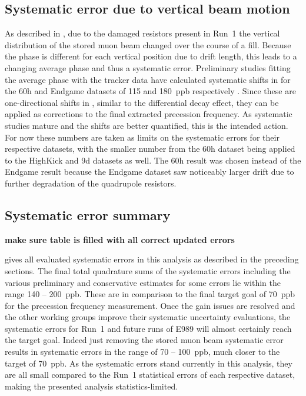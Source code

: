 \subsection{Systematic error due to vertical beam motion}


As described in , due to the damaged resistors present in Run~1 the vertical distribution of the stored muon beam changed over the course of a fill. Because the \gmtwo phase is different for each vertical position due to drift length, this leads to a changing average phase and thus a systematic error. Preliminary studies fitting the average \gmtwo phase with the tracker data have calculated systematic shifts in \wa for the 60h and Endgame datasets of \SI{115}{} and \SI{180}{ppb} respectively \cite{BadResistorsVolodya}. Since these are one-directional shifts in \wa, similar to the differential decay effect, they can be applied as corrections to the final extracted precession frequency. As systematic studies mature and the shifts are better quantified, this is the intended action. For now these numbers are taken as limits on the systematic errors for their respective datasets, with the smaller number from the 60h dataset being applied to the HighKick and 9d datasets as well. The 60h result was chosen instead of the Endgame result because the Endgame dataset saw noticeably larger drift due to further degradation of the quadrupole resistors.




\subsection{Systematic error summary}

\textbf{make sure table is filled with all correct updated errors}

 gives all evaluated systematic errors in this analysis as described in the preceding sections. The final total quadrature sums of the systematic errors including the various preliminary and conservative estimates for some errors lie within the range \SI{140}{} -- \SI{200}{ppb}. These are in comparison to the final target goal of \SI{70}{ppb} for the precession frequency measurement. Once the gain issues are resolved and the other working groups improve their systematic uncertainty evaluations, the systematic errors for Run~1 and future runs of E989 will almost certainly reach the target goal. Indeed just removing the stored muon beam systematic error results in systematic errors in the range of \SI{70}{} -- \SI{100}{ppb}, much closer to the target of \SI{70}{ppb}. As the systematic errors stand currently in this analysis, they are all small compared to the Run~1 statistical errors of each respective dataset, making the presented analysis statistics-limited. 



